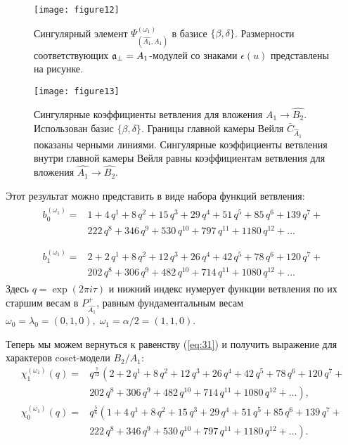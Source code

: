 \begin{figure}[h!tb]
  \centering
  \texttt{[image: figure12]}
  \caption{Сингулярный элемент $\Psi ^{\left( \omega_1 \right) }_{\left(  \widehat{A_1}, A_1 \right)}$ в базисе $\{\beta,\delta\}$. Размерности соответствующих  $\mathfrak{a}_{\perp}=A_1$-модулей со знаками  $\epsilon(u)$ представлены на рисунке.}
  \label{fig:AffineB2_A1_anom_proj}
\end{figure}

\begin{figure}[tb]
  \centering
  \texttt{[image: figure13]}
  \caption{Сингулярные коэффициенты ветвления для вложения $\hat{A_1}\rightarrow \hat{B_2}$. Использован базис $\{\beta,\delta\}$. Границы главной камеры Вейля $\bar{C}_{\hat{A}_1}$ показаны черными линиями. Сингулярные коэффициенты ветвления внутри главной камеры Вейля равны коэффициентам ветвления для вложения $\hat{A_1}\rightarrow \hat{B_2}$.}
  \label{fig:AffineB2_A1_branching}
\end{figure}

Этот результат можно представить в виде набора функций ветвления:
\begin{eqnarray*}
  \label{eq:29}
  \begin{array}{cc}
    b^{(\omega_1)}_{0}= & 1 + 4\,q^{1}+ 8\,q^{2}+ 15\,q^{3}+ 29\,q^{4}+ 51\,q^{5}+ 85\,q^{6}+ 139\,q^{7}+\\
     &222\,q^{8}+ 346\,q^{9}+ 530\,q^{10}+ 797\,q^{11}+ 1180\,q^{12}+\dots\\
  \end{array}\\
  \begin{array}{cc}
    b^{(\omega_1)}_{1}= &2+2\,q^{1}+8\,q^{2}+12\,q^{3}+26\,q^{4}+42\,q^{5}+78\,q^{6}+120\,q^{7}+\\
    & 202\,q^{8}+306\,q^{9}+482\,q^{10}+714\,q^{11}+1080\,q^{12}+\dots
  \end{array}
\end{eqnarray*}
Здесь $q=\exp (2\pi i \tau)$ и нижний индекс нумерует функции ветвления по их старшим весам в  $P^+_{\hat{A_1}}$, равным фундаментальным весам $\omega_0=\lambda_0=(0,1,0),\; \omega_1=\alpha/2=(1,1,0)$.

Теперь мы можем вернуться к равенству (\ref{eq:31}) и получить выражение для характеров coset-модели $B_2/A_1$:
\begin{equation*}
  \label{eq:35}
  \begin{array}{cc}
    \chi^{(\omega_1)}_{1}(q)= & q^{\frac{7}{12}}\left( 2+2\,q^{1}+8\,q^{2}+12\,q^{3}+26\,q^{4}+42\,q^{5}+78\,q^{6}+120\,q^{7}+\right. \\
    & \left. 202\,q^{8}+306\,q^{9}+482\,q^{10}+714\,q^{11}+1080\,q^{12}+\dots \right),\\
    \chi^{(\omega_1)}_{0}(q) = & q^{\frac{5}{6}}\left(1 + 4\,q^{1}+ 8\,q^{2}+ 15\,q^{3}+ 29\,q^{4}+ 51\,q^{5}+ 85\,q^{6}+ 139\,q^{7}+\right. \\
    &\left. 222\,q^{8}+ 346\,q^{9}+ 530\,q^{10}+ 797\,q^{11}+ 1180\,q^{12}+\dots\right).
  \end{array}
\end{equation*}

